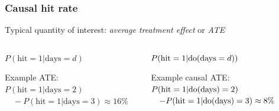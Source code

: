 \begin{frame}
\frametitle{Causal hit rate}
Typical quantity of interest: \emph{average treatment effect} or \emph{ATE}
\begin{columns}[T] %
    \begin{column}{.48\textwidth}
        $P(\textrm{hit}=1 | \textrm{days}=d)$\newline

        \newline\newline

        Example ATE: \newline
        $P(\textrm{hit}=1 | \textrm{days} = 2) $\newline
        $\quad - P(\textrm{hit}=1 | \textrm{days} = 3) \approx  16\%$
    \end{column}%
    \begin{column}{.48\textwidth}
        $P(\textrm{hit}=1 | \mathrm{do}(\textrm{days}=d))$\newline

          \newline \newline
	Example causal ATE: \newline
	$P(\textrm{hit}=1 |\mathrm{do}(\textrm{days} )= 2)$\newline
	$\quad - P(\textrm{hit}=1 | \mathrm{do}(\textrm{days}) = 3) \approx 8\%$
         \end{column}%
    \end{columns}

\end{frame}

